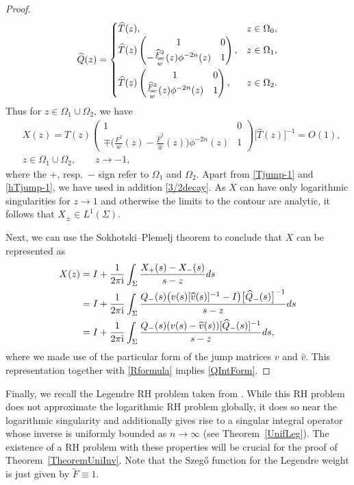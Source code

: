 \documentclass[11pt]{article}
\numberwithin{equation}{section}
\newcommand{\Id}{I}
\newcommand{\hw}{\widehat w}
\newcommand{\hQ}{{\widehat Q}}
\newcommand{\bv}{v}
\newcommand{\hv}{{\widehat v}}
\newcommand{\hF}{\widehat F}
\newcommand{\I}{\mathrm{i}}
\numberwithin{equation}{section}
\begin{document}
\begin{proof}
\begin{align*}
 \hQ(z) =
\begin{cases}
\widehat T(z), & z \in \Omega_0,
\\
\widehat T(z)
\begin{pmatrix}
1 & 0
\\
-\frac{\hF^2}{\hw}(z) \phi^{-2n}(z) & 1
\end{pmatrix},
& z \in \Omega_1,\vspace{1mm}
\\
\widehat T(z)
\begin{pmatrix}
1 & 0
\\
\frac{\hF^2}{\hw}(z) \phi^{-2n}(z) & 1
\end{pmatrix},& z \in \Omega_2.
\end{cases}
\end{align*}
Thus for $z\in \Omega_1\cup \Omega_2$, we have
\begin{align*}
 &X(z) = T(z)
 \begin{pmatrix}
 1 & 0
 \\
 \mp\big(\frac{F^2}{w}(z)-\frac{\hF^2}{\hw}(z)\big) \phi^{-2n}(z) & 1
 \end{pmatrix}
 \big[\widehat T(z)\big]^{-1} = O(1),
 \\
 &z\in \Omega_1\cup\Omega_2, \qquad z\to-1,
\end{align*}
where the $+$, resp.\ $-$ sign refer to $\Omega_1$ and $\Omega_2$. Apart from \eqref{Tjump-1} and \eqref{hTjump-1}, we have used in addition \eqref{3/2decay}. As $X$ can have only logarithmic singularities for $z \to 1$ and otherwise the limits to the contour are analytic, it follows that $X_\pm \in L^1(\Sigma)$.

Next, we can use the Sokhotski--Plemelj theorem to conclude that $X$ can be represented as
\begin{align*}
 X(z) &= \Id + \frac{1}{2\pi \I}\int_\Sigma \frac{X_+(s)-X_-(s)}{s-z} {\rm d}s
 \\
 &= \Id + \frac{1}{2\pi \I}\int_\Sigma \frac{Q_-(s)\big(\bv(s)[\hv(s)]^{-1}-\Id\big)\big[\hQ_-(s)\big]^{-1}}{s-z} {\rm d}s
 \\
 &= \Id + \frac{1}{2\pi \I}\int_\Sigma \frac{Q_-(s)(\bv(s)-\hv(s))[\hQ_-(s)]^{-1}}{s-z} {\rm d}s,
\end{align*}
where we made use of the particular form of the jump matrices $\bv$ and $\hv$. This representation together with \eqref{Rformula} implies \eqref{QIntForm}.
\end{proof}

Finally, we recall the Legendre RH problem taken from \cite[Section~3.4]{CD}. While this RH problem does not approximate the logarithmic RH problem globally, it does so near the logarithmic singularity and additionally gives rise to a singular integral operator whose inverse is uniformly bounded as $n \to \infty$ (see Theorem~\ref{UnifLeg}). The existence of a RH problem with these properties will be crucial for the proof of Theorem~\ref{TheoremUniInv}. Note that the Szeg\H{o} function for the Legendre weight is just given by $\widetilde F \equiv 1$.
\end{document}
